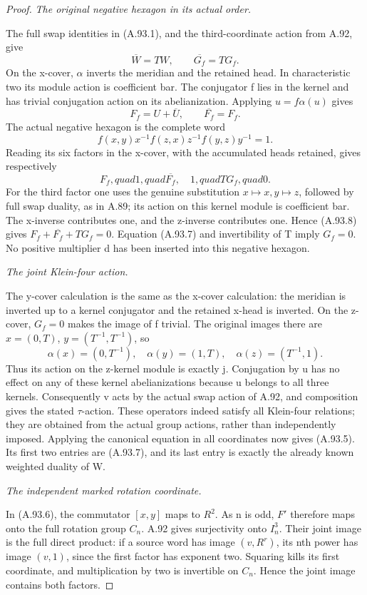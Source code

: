 \begin{proof}
\emph{The original negative hexagon in its actual order.}\par
The full swap identities in (A.93.1), and the third-coordinate
action from A.92, give
\[
            \overline W=TW,\qquad \overline{G_f}=TG_f.
\]
On the x-cover, \(\alpha\) inverts the meridian and the
retained head. In characteristic two its module action is
coefficient bar. The conjugator f lies in the kernel and has
trivial conjugation action on its abelianization. Applying
\(u=f\alpha(u)\) gives
\[
                   F_f=U+\overline U,
                   \qquad \overline{F_f}=F_f.
\tag{A.93.7}
\]
The actual negative hexagon is the complete word
\[
        f(x,y)x^{-1}f(z,x)z^{-1}f(y,z)y^{-1}=1.
\tag{A.93.8}
\]
Reading its six factors in the x-cover, with the accumulated
heads retained, gives respectively
\[
                   F_f,quad1,quad\overline{F_f},
                        \quad1,quad TG_f,quad0.
\tag{A.93.9}
\]
For the third factor one uses the genuine substitution
\(x\mapsto x,y\mapsto z\), followed by full swap duality,
as in A.89; its action on this kernel module is coefficient
bar. The x-inverse contributes one, and the z-inverse contributes
one. Hence (A.93.8) gives
\(F_f+\overline{F_f}+TG_f=0\). Equation (A.93.7) and
invertibility of T imply \(G_f=0\). No positive multiplier d
has been inserted into this negative hexagon.

\emph{The joint Klein-four action.}\par
The y-cover calculation is the same as the x-cover calculation:
the meridian is inverted up to a kernel conjugator and the
retained x-head is inverted. On the z-cover, \(G_f=0\)
makes the image of f trivial. The original images there are
\(x=(0,T)\), \(y=(T^{-1},T^{-1})\), so
\[
 \alpha(x)=(0,T^{-1}),\quad
 \alpha(y)=(1,T),\quad \alpha(z)=(T^{-1},1).
\]
Thus its action on the z-kernel module is exactly j.
Conjugation by u has no effect on any of these kernel
abelianizations because u belongs to all three kernels.
Consequently v acts by the actual swap action of A.92, and
composition gives the stated \(\tau\)-action. These operators
indeed satisfy all Klein-four relations; they are obtained from
the actual group actions, rather than independently imposed.
Applying the canonical equation in all coordinates now gives
(A.93.5). Its first two entries are (A.93.7), and its last
entry is exactly the already known weighted duality of W.

\emph{The independent marked rotation coordinate.}\par
In (A.93.6), the commutator \([x,y]\) maps to \(R^2\).
As n is odd, \(F'\) therefore maps onto the full rotation
group \(C_n\). A.92 gives surjectivity onto \(I_n^3\).
Their joint image is the full direct product: if a source
word has image \((v,R^r)\), its nth power has image \((v,1)\),
since the first factor has exponent two. Squaring kills its
first coordinate, and multiplication by two is invertible
on \(C_n\). Hence the joint image contains both factors.


\end{proof}
